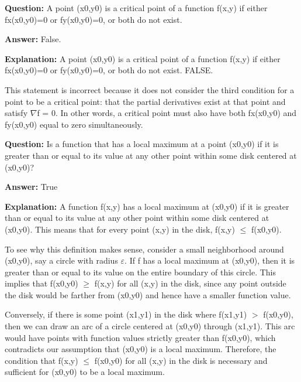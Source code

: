 \documentclass{article}
\begin{document}
                \vspace{0.5cm} 
        
            
                \textbf {Question:} A point (x0,y0) is a critical point of a function f(x,y) if either fx(x0,y0)=0 or fy(x0,y0)=0, or both do not exist.
                
                \textbf{Answer:} False.

                \textbf{Explanation:} A point (x0,y0) is a critical point of a function f(x,y) if either fx(x0,y0)=0 or fy(x0,y0)=0, or both do not exist. FALSE.

This statement is incorrect because it does not consider the third condition for a point to be a critical point: that the partial derivatives exist at that point and satisfy \ensuremath{\nabla}f = 0. In other words, a critical point must also have both fx(x0,y0) and fy(x0,y0) equal to zero simultaneously.
                
                \vspace{0.5cm} 
        
            
                \textbf {Question:} Is a function that has a local maximum at a point (x0,y0) if it is greater than or equal to its value at any other point within some disk centered at (x0,y0)?
                
                \textbf{Answer:} True

                \textbf{Explanation:} A function f(x,y) has a local maximum at (x0,y0) if it is greater than or equal to its value at any other point within some disk centered at (x0,y0). This means that for every point (x,y) in the disk, f(x,y) \ensuremath{\leq} f(x0,y0).

To see why this definition makes sense, consider a small neighborhood around (x0,y0), say a circle with radius \ensuremath{\varepsilon}. If f has a local maximum at (x0,y0), then it is greater than or equal to its value on the entire boundary of this circle. This implies that f(x0,y0) \ensuremath{\geq} f(x,y) for all (x,y) in the disk, since any point outside the disk would be farther from (x0,y0) and hence have a smaller function value.

Conversely, if there is some point (x1,y1) in the disk where f(x1,y1) \ensuremath{>} f(x0,y0), then we can draw an arc of a circle centered at (x0,y0) through (x1,y1). This arc would have points with function values strictly greater than f(x0,y0), which contradicts our assumption that (x0,y0) is a local maximum. Therefore, the condition that f(x,y) \ensuremath{\leq} f(x0,y0) for all (x,y) in the disk is necessary and sufficient for (x0,y0) to be a local maximum.
                
\end{document}
